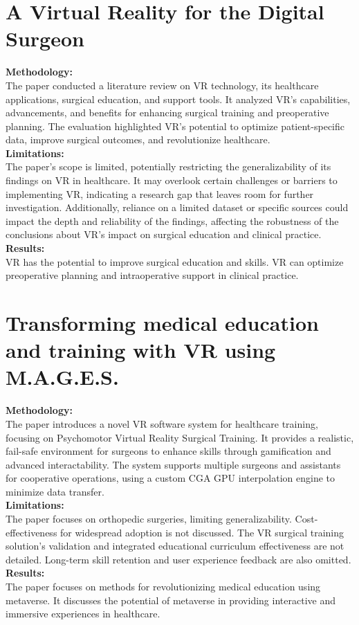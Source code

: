 \section{A Virtual Reality for the Digital Surgeon\cite{velazquez2021virtual}}
\textbf{Methodology:}\\The paper conducted a literature review on VR technology, its healthcare applications, surgical education, and support tools. It analyzed VR's capabilities, advancements, and benefits for enhancing surgical training and preoperative planning. The evaluation highlighted VR's potential to optimize patient-specific data, improve surgical outcomes, and revolutionize healthcare.\\
\textbf{Limitations:}\\The paper's scope is limited, potentially restricting the generalizability of its findings on VR in healthcare. It may overlook certain challenges or barriers to implementing VR, indicating a research gap that leaves room for further investigation. Additionally, reliance on a limited dataset or specific sources could impact the depth and reliability of the findings, affecting the robustness of the conclusions about VR's impact on surgical education and clinical practice.\\
\textbf{Results:}\\ VR has the potential to improve surgical education and skills.
VR can optimize preoperative planning and intraoperative support in clinical practice.
\section{Transforming medical education and training with VR using M.A.G.E.S.\cite{ProceedingsArticle}}
\textbf{Methodology:}\\The paper introduces a novel VR software system for healthcare training, focusing on Psychomotor Virtual Reality Surgical Training. It provides a realistic, fail-safe environment for surgeons to enhance skills through gamification and advanced interactability. The system supports multiple surgeons and assistants for cooperative operations, using a custom CGA GPU interpolation engine to minimize data transfer.\\
\textbf{Limitations:}\\The paper focuses on orthopedic surgeries, limiting generalizability. Cost-effectiveness for widespread adoption is not discussed. The VR surgical training solution's validation and integrated educational curriculum effectiveness are not detailed. Long-term skill retention and user experience feedback are also omitted.\\
\textbf{Results:}\\The paper focuses on methods for revolutionizing medical education using metaverse. It discusses the potential of metaverse in providing interactive and immersive experiences in healthcare.
